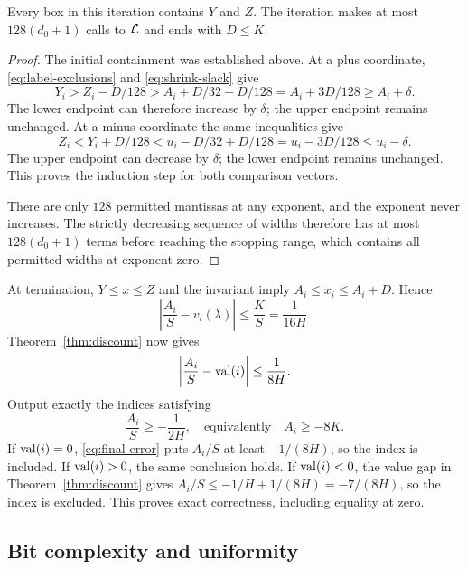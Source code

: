 \begin{lemma}
\label{lem:box-invariant}
Every box in this iteration contains $Y$ and $Z$. The iteration makes
at most $128(d_0+1)$ calls to $\mathcal L$ and ends with $D\le K$.
\end{lemma}
\begin{proof}
The initial containment was established above. At a plus coordinate,
\eqref{eq:label-exclusions} and \eqref{eq:shrink-slack} give
\[
 Y_i>Z_i-D/128>A_i+D/32-D/128
       =A_i+3D/128\ge A_i+\delta.
\]
The lower endpoint can therefore increase by $\delta$; the upper
endpoint remains unchanged. At a minus coordinate the same inequalities
give
\[
 Z_i<Y_i+D/128<u_i-D/32+D/128
       =u_i-3D/128\le u_i-\delta.
\]
The upper endpoint can decrease by $\delta$; the lower endpoint remains
unchanged. This proves the induction step for both comparison vectors.

There are only $128$ permitted mantissas at any exponent, and the
exponent never increases. The strictly decreasing sequence of widths
therefore has at most $128(d_0+1)$ terms before reaching the stopping
range, which contains all permitted widths at exponent zero.
\end{proof}

At termination, $Y\le x\le Z$ and the invariant imply
$A_i\le x_i\le A_i+D$. Hence
\begin{equation}
 \left|\frac{A_i}{S}-v_i(\lambda)\right|
 \le\frac KS=\frac1{16H}.
 \label{eq:fixedpoint-error}
\end{equation}
Theorem~\ref{thm:discount} now gives
\begin{equation}
 \left|\frac{A_i}{S}-\operatorname{val}(i)\right|\le\frac1{8H}.
 \label{eq:final-error}
\end{equation}
Output exactly the indices satisfying
\begin{equation}
 \frac{A_i}{S}\ge-\frac1{2H},
 \quad\text{equivalently}\quad A_i\ge-8K.
 \label{eq:output-test}
\end{equation}
If $\operatorname{val}(i)=0$, \eqref{eq:final-error} puts $A_i/S$ at least
$-1/(8H)$, so the index is included. If $\operatorname{val}(i)>0$, the same conclusion
holds. If $\operatorname{val}(i)<0$, the value gap in Theorem~\ref{thm:discount}
gives $A_i/S\le-1/H+1/(8H)=-7/(8H)$, so the index is excluded.
This proves exact correctness, including equality at zero.

\subsection{Bit complexity and uniformity}
\label{subsec:bit-complexity}

